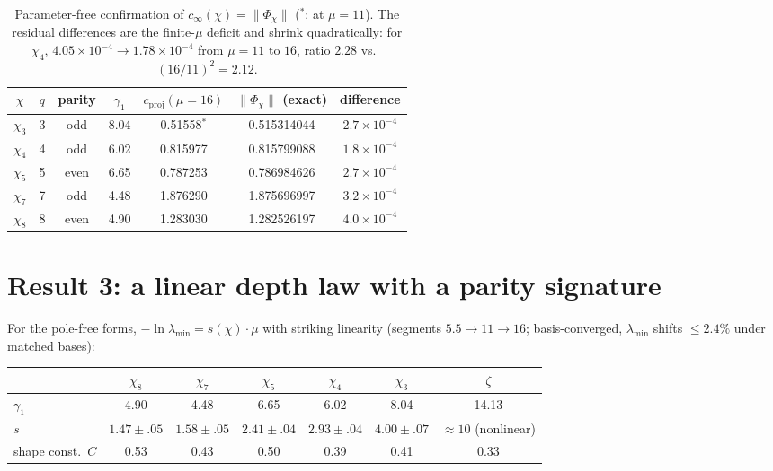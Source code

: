 \documentclass[10pt]{article}
\newcommand{\norm}[1]{\lVert #1\rVert}
\begin{document}
\begin{table}[h]\centering\small
\begin{tabular}{ccccccc}
\toprule
$\chi$ & $q$ & parity & $\gamma_1$ & $c_{\mathrm{proj}}(\mu{=}16)$ &
$\norm{\Phi_\chi}$ (exact) & difference \\
\midrule
$\chi_3$ & 3 & odd  & 8.04 & 0.51558$^{*}$ & 0.515314044 & $2.7\times10^{-4}$ \\
$\chi_4$ & 4 & odd  & 6.02 & 0.815977 & 0.815799088 & $1.8\times10^{-4}$ \\
$\chi_5$ & 5 & even & 6.65 & 0.787253 & 0.786984626 & $2.7\times10^{-4}$ \\
$\chi_7$ & 7 & odd  & 4.48 & 1.876290 & 1.875696997 & $3.2\times10^{-4}$ \\
$\chi_8$ & 8 & even & 4.90 & 1.283030 & 1.282526197 & $4.0\times10^{-4}$ \\
\bottomrule
\end{tabular}
\caption{\small Parameter-free confirmation of $c_\infty(\chi)=
\norm{\Phi_\chi}$ ($^{*}$: at $\mu=11$). The residual differences are
the finite-$\mu$ deficit and shrink quadratically: for $\chi_4$,
$4.05\times10^{-4}\to1.78\times10^{-4}$ from $\mu=11$ to $16$, ratio
$2.28$ vs.\ $(16/11)^2=2.12$.}
\end{table}

\section{Result 3: a linear depth law with a parity signature}

For the pole-free forms, $-\ln\lambda_{\min}=s(\chi)\cdot\mu$ with
striking linearity (segments $5.5\!\to\!11\!\to\!16$; basis-converged,
$\lambda_{\min}$ shifts $\le2.4\%$ under matched bases):

\begin{center}\small
\begin{tabular}{lcccccc}
\toprule
 & $\chi_8$ & $\chi_7$ & $\chi_5$ & $\chi_4$ & $\chi_3$ & $\zeta$ \\
\midrule
$\gamma_1$ & 4.90 & 4.48 & 6.65 & 6.02 & 8.04 & 14.13 \\
$s$ & $1.47\pm.05$ & $1.58\pm.05$ & $2.41\pm.04$ & $2.93\pm.04$ &
$4.00\pm.07$ & $\approx10$ (nonlinear) \\
shape const.\ $C$ & 0.53 & 0.43 & 0.50 & 0.39 & 0.41 & 0.33 \\
\bottomrule
\end{tabular}
\end{center}
\end{document}
